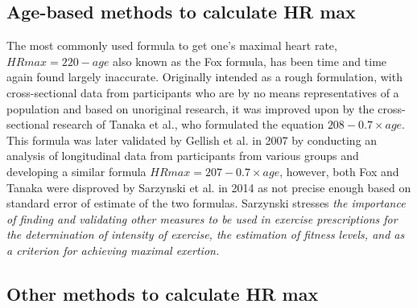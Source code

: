 \subsection*{Age-based methods to calculate HR max}
The most commonly used formula to get one's maximal heart rate, $HRmax=220-age$ also known as the Fox formula, has been time and time again found largely inaccurate.
Originally intended as a rough formulation, with cross-sectional data from participants who are by no means representatives of a population\cite{220-hrmax-new-formula} and based on unoriginal research\cite{220-hrmax-disproved}, it was improved upon by the cross-sectional research of Tanaka et al., who formulated the equation $208-0.7\times age$.
This formula was later validated by Gellish et al. in 2007 by conducting an analysis of longitudinal data from participants from various groups and developing a similar formula $HRmax=207−0.7\times age$,
however, both Fox and Tanaka were disproved by Sarzynski et al. in 2014 as not precise enough based on standard error of estimate of the two formulas.\cite{hrmax-age-disproved}
Sarzynski stresses \textit{the importance of finding and validating other measures to be used in exercise prescriptions for the determination of intensity of exercise, the estimation of fitness levels, and as a criterion for achieving maximal exertion.}

\subsection*{Other methods to calculate HR max}